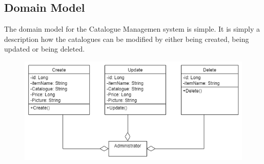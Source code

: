 \documentclass[12pt]{article}
\begin{document}
\subsection{Domain Model}
The domain model for the Catalogue Managemen system is simple. It is simply a description how the  catalogues can be modified by either being created, being updated or being deleted.
\begin{figure}[h]
\centering
\includegraphics[scale=0.7]{diagrams/notdom.png}
\end{figure}
\newpage
\end{document}
